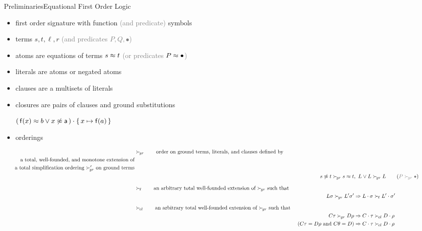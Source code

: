 \documentclass[%
handout,
]{beamer}
\begin{document}
\begin{frame}[allowframebreaks]{Preliminaries}{Equational First Order Logic}

    \begin{itemize}
        \item first order signature with function \textcolor{gray}{(and predicate)} symbols
        \item terms $s,t,\ell,r$
        \hfill\textcolor{gray}{(and predicates $P, Q, \bullet$)}
        \item atoms are equations of terms $s\approx t$
        \hfill\textcolor{gray}{(or predicates $P\approx\bullet$)}
        \item literals are atoms or negated atoms
        \item clauses are a multisets of literals
        \item closures are pairs of clauses and ground substitutions
        \vspace{0.7em}

        $(\,\mathsf{f}(x)\approx b\lor x\not\approx\mathsf{a}\,)\cdot\{\,x\mapsto\mathsf{f}(a)\,\}$

        \framebreak
        \item orderings
    \end{itemize}
    \vspace{-1.4em}
    \begin{align*}
        &\succG
        \tag*{order on ground terms, literals, and clauses defined by}
        \\
        \tag*{a total, well-founded, and monotone extension of}
        \\
        \tag*{a total simplification ordering $\succG'$ on ground terms}
        \\
        &&s\mNE t \succG s\mEQ t &,\ L\lor L \succG L
        \tag{\textcolor{gray}{$P\succG\bullet$}}
        \\[0.7em]
        &\succL
        \tag*{an arbitrary total well-founded extension of $\succG$ such that}
        \\
        && L\sigma\succG L'\sigma' &\Rightarrow L\cdot\sigma\succL L'\cdot\sigma'\tag*{}
        \\[0.7em]
        &\succC \tag*{an arbitrary total well-founded extension of $\succG$ such that }
        \\
        && C\tau\succG D\rho
        &\Rightarrow C\cdot\tau\succC D\cdot\rho
        \\
        && (C\tau=D\rho\text{ and }C\theta = D)
        &\Rightarrow C\cdot\tau\succC D\cdot\rho   \tag*{}
    \end{align*}
\end{frame}
\end{document}
